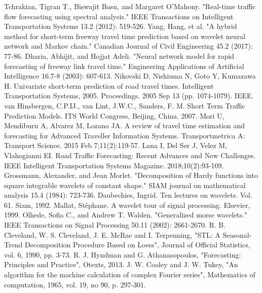 \documentclass[a4paper, 10pt, conference]{ieeeconf}      %
\begin{document}
\begin{thebibliography}{00}
 Tchrakian, Tigran T., Biswajit Basu, and Margaret O'Mahony. "Real-time traffic flow forecasting using spectral analysis." IEEE Transactions on Intelligent Transportation Systems 13.2 (2012): 519-526.
 Yang, Hang, et al. "A hybrid method for short-term freeway travel time prediction based on wavelet neural network and Markov chain." Canadian Journal of Civil Engineering 45.2 (2017): 77-86.
 Dharia, Abhijit, and Hojjat Adeli. "Neural network model for rapid forecasting of freeway link travel time." Engineering Applications of Artificial Intelligence 16.7-8 (2003): 607-613.
 Nikovski D, Nishiuma N, Goto Y, Kumazawa H. Univariate short-term prediction of road travel times. Intelligent Transportation Systems, 2005. Proceedings. 2005 Sep 13 (pp. 1074-1079). IEEE.
 van Hinsbergen, C.P.IJ., van Lint, J.W.C.,  Sanders, F. M. Short Term Traffic Prediction Models. ITS World Congress, Beijing, China. 2007.
 Mori U, Mendiburu A, Alvarez M, Lozano JA. A review of travel time estimation and forecasting for Advanced Traveller Information Systems. Transportmetrica A: Transport Science. 2015 Feb 7;11(2):119-57.
 Lana I, Del Ser J, Velez M, Vlahogianni EI. Road Traffic Forecasting: Recent Advances and New Challenges. IEEE Intelligent Transportation Systems Magazine. 2018;10(2):93-109.
 Grossmann, Alexander, and Jean Morlet. "Decomposition of Hardy functions into square integrable wavelets of constant shape." SIAM journal on mathematical analysis 15.4 (1984): 723-736.
 Daubechies, Ingrid. Ten lectures on wavelets. Vol. 61. Siam, 1992.
 Mallat, Stéphane. A wavelet tour of signal processing. Elsevier, 1999.
 Olhede, Sofia C., and Andrew T. Walden. "Generalized morse wavelets." IEEE Transactions on Signal Processing 50.11 (2002): 2661-2670.
 R. B. Cleveland, W. S. Cleveland, J. E. McRae and I. Terpenning, "STL: A Seasonal-Trend Decomposition Procedure Based on Loess", Journal of Official Statistics, vol. 6, 1990, pp. 3-73.
 R. J. Hyndman and G. Athanasopoulos, "Forecasting: Principles and Practice", Otexts, 2013.
 J. W. Cooley and J. W. Tukey, "An algorithm for the machine calculation of complex Fourier series", Mathematics of computation, 1965, vol. 19, no 90, p. 297-301.
\end{thebibliography}
\end{document}
